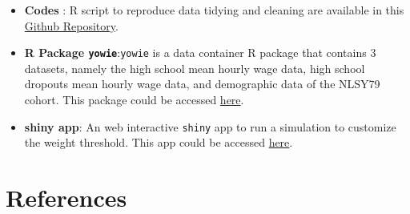 \documentclass{article}
\begin{document}
\begin{itemize}
\item
  \textbf{Codes} : R script to reproduce data tidying and cleaning are available in this \href{https://github.com/numbats/yowie/blob/master/data-raw/data_preprocessing.R}{Github Repository}.
\item
  \textbf{R Package \texttt{yowie}}:\texttt{yowie} is a data container R package that contains 3 datasets, namely the high school mean hourly wage data, high school dropouts mean hourly wage data, and demographic data of the NLSY79 cohort. This package could be accessed \href{https://github.com/numbats/yowie}{here}.
\item
  \textbf{shiny app}: An web interactive \texttt{shiny} app to run a simulation to customize the weight threshold. This app could be accessed \href{https://github.com/numbats/wages-refresh/tree/main/app}{here}.
\end{itemize}

\hypertarget{references}{%
\section*{References}\label{references}}
\end{document}
